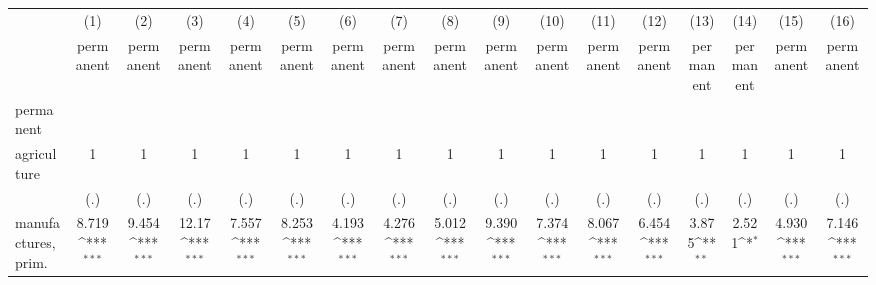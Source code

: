{
\def\sym#1{\ifmmode^{#1}\else\(^{#1}\)\fi}
\begin{tabular}{l*{16}{c}}
\hline\hline
                    &\multicolumn{1}{c}{(1)}&\multicolumn{1}{c}{(2)}&\multicolumn{1}{c}{(3)}&\multicolumn{1}{c}{(4)}&\multicolumn{1}{c}{(5)}&\multicolumn{1}{c}{(6)}&\multicolumn{1}{c}{(7)}&\multicolumn{1}{c}{(8)}&\multicolumn{1}{c}{(9)}&\multicolumn{1}{c}{(10)}&\multicolumn{1}{c}{(11)}&\multicolumn{1}{c}{(12)}&\multicolumn{1}{c}{(13)}&\multicolumn{1}{c}{(14)}&\multicolumn{1}{c}{(15)}&\multicolumn{1}{c}{(16)}\\
                    &\multicolumn{1}{c}{permanent}&\multicolumn{1}{c}{permanent}&\multicolumn{1}{c}{permanent}&\multicolumn{1}{c}{permanent}&\multicolumn{1}{c}{permanent}&\multicolumn{1}{c}{permanent}&\multicolumn{1}{c}{permanent}&\multicolumn{1}{c}{permanent}&\multicolumn{1}{c}{permanent}&\multicolumn{1}{c}{permanent}&\multicolumn{1}{c}{permanent}&\multicolumn{1}{c}{permanent}&\multicolumn{1}{c}{permanent}&\multicolumn{1}{c}{permanent}&\multicolumn{1}{c}{permanent}&\multicolumn{1}{c}{permanent}\\
\hline
permanent           &                     &                     &                     &                     &                     &                     &                     &                     &                     &                     &                     &                     &                     &                     &                     &                     \\
agriculture         &           1         &           1         &           1         &           1         &           1         &           1         &           1         &           1         &           1         &           1         &           1         &           1         &           1         &           1         &           1         &           1         \\
                    &         (.)         &         (.)         &         (.)         &         (.)         &         (.)         &         (.)         &         (.)         &         (.)         &         (.)         &         (.)         &         (.)         &         (.)         &         (.)         &         (.)         &         (.)         &         (.)         \\
[1em]
manufactures, prim. &       8.719\sym{***}&       9.454\sym{***}&       12.17\sym{***}&       7.557\sym{***}&       8.253\sym{***}&       4.193\sym{***}&       4.276\sym{***}&       5.012\sym{***}&       9.390\sym{***}&       7.374\sym{***}&       8.067\sym{***}&       6.454\sym{***}&       3.875\sym{**} &       2.521\sym{*}  &       4.930\sym{***}&       7.146\sym{***}\\

\end{tabular}}
